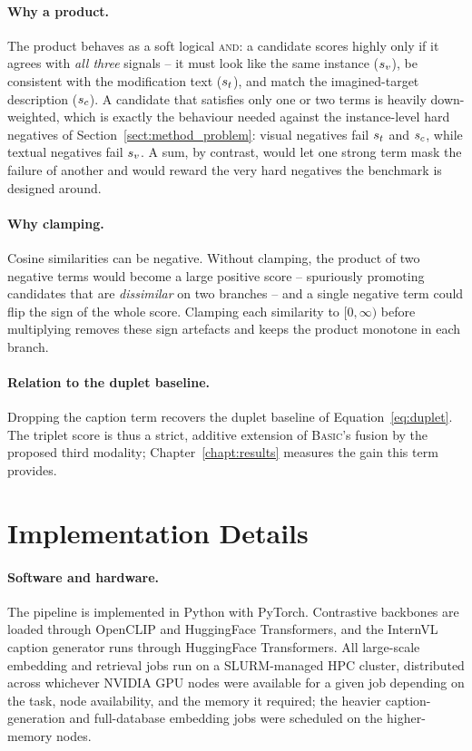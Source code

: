 \paragraph{Why a product.} The product behaves as a soft logical
\textsc{and}: a candidate scores highly only if it agrees with \emph{all three}
signals -- it must look like the same instance ($\sv$), be consistent with the
modification text ($\st$), and match the imagined-target description ($\sc$). A
candidate that satisfies only one or two terms is heavily down-weighted, which
is exactly the behaviour needed against the instance-level hard negatives of
Section~\ref{sect:method_problem}: visual negatives fail $\st$ and $\sc$, while
textual negatives fail $\sv$. A sum, by contrast, would let one strong term mask
the failure of another and would reward the very hard negatives the benchmark is
designed around.

\paragraph{Why clamping.} Cosine similarities can be negative. Without
clamping, the product of two negative terms would become a large positive score
-- spuriously promoting candidates that are \emph{dissimilar} on two branches --
and a single negative term could flip the sign of the whole score. Clamping each
similarity to $[0, \infty)$ before multiplying removes these sign artefacts and
keeps the product monotone in each branch.

\paragraph{Relation to the duplet baseline.} Dropping the caption term recovers
the duplet baseline of Equation~\eqref{eq:duplet}. The triplet score is thus a
strict, additive extension of \textsc{Basic}'s fusion by the proposed third
modality; Chapter~\ref{chapt:results} measures the gain this term provides.

\section{Implementation Details}\label{sect:method_impl}

\paragraph{Software and hardware.} The pipeline is implemented in Python with
PyTorch. Contrastive backbones are loaded through OpenCLIP and HuggingFace
Transformers, and the InternVL caption generator runs through HuggingFace
Transformers. All large-scale embedding and retrieval jobs run on a SLURM-managed
HPC cluster, distributed across whichever NVIDIA GPU nodes were available for a
given job depending on the task, node availability, and the memory it required;
the heavier caption-generation and full-database embedding jobs were scheduled on
the higher-memory nodes.

